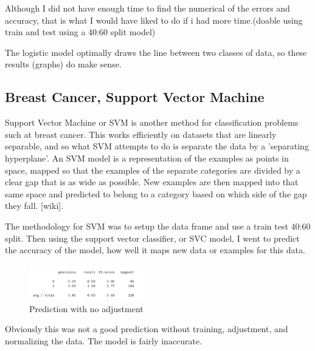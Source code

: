 \documentclass[conference]{IEEEtran}
\begin{document}
Although I did not have enough time to find the numerical of the errors and accuracy, that is what I would have liked to do if i had more time.(doable using train  and test using a 40:60 split model)

The logistic model optimally draws the line between two classes of data, so these results (graphs) do make sense.


\subsection{Breast Cancer, Support Vector Machine}
Support Vector Machine or SVM is another method for classification problems such at breast cancer. This works efficiently on datasets that are linearly separable, and so what SVM attempts to do is separate the data by a 'separating hyperplane'.  An SVM model is a representation of the examples as points in space, mapped so that the examples of the separate categories are divided by a clear gap that is as wide as possible. New examples are then mapped into that same space and predicted to belong to a category based on which side of the gap they fall. [wiki].

The methodology for SVM was to setup the data frame and use a train test 40:60 split. Then using the support vector classifier, or SVC model, I went to predict the accuracy of the model, how well it maps new data or examples for this data. 

\newpage
\begin{figure}[htbp]
\centerline{\includegraphics[width=50mm,scale=0.5]{imgs/class1}}
\caption{Prediction with no adjustment}
\label{fig}
\end{figure}
Obviously this was not a good prediction without training, adjustment, and normalizing the data. The model is fairly inaccurate. 
\end{document}
